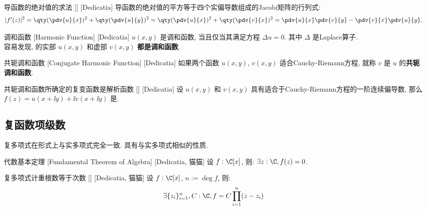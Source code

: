 \documentclass[UTF8]{ctexart}
\begin{document}
        \begin{crl}
            [UUID]
            {导函数的绝对值的求法}
            []
            [Dedicatia]
            导函数的绝对值的平方等于四个实偏导数组成的Jacobi矩阵的行列式: 
            \[|f'(z)|^2=\qty(\pdv{u}{x})^2+\qty(\pdv{u}{y})^2=\qty(\pdv{u}{x})^2+\qty(\pdv{v}{x})^2=\pdv{u}{x}\pdv{v}{y}-\pdv{v}{x}\pdv{u}{y}.\]
        \end{crl}

        \begin{dfn}
            [UUID]
            {调和函数}
            [Harmonic Function]
            [Dedicatia]
            \(u(x,y)\) 是调和函数, 当且仅当其满足方程 \(\Delta u=0\). 其中 \(\Delta\) 是Laplace算子. \\
            容易发现,  的实部 \(u(x,y)\) 和虚部 \(v(x,y)\) \textbf{都是调和函数}. 
        \end{dfn}

        \begin{dfn}
            [UUID]
            {共轭调和函数}
            [Conjugate Harmonic Function]
            [Dedicatia]
            如果两个函数 \(u(x,y)\),  \(v(x,y)\) 适合Cauchy-Riemann方程, 就称 \(v\) 是 \(u\) 的\textbf{共轭调和函数}. 
        \end{dfn}

        \begin{thm}
            [UUID]
            {共轭调和函数所确定的复变函数是解析函数}
            []
            [Dedicatia]
            设 \(u(x,y)\) 和 \(v(x,y)\) 具有适合于Cauchy-Riemann方程的一阶连续偏导数, 那么 \(f(z)=u(x+\ii y)+\ii v(x+\ii y)\) 是. 
        \end{thm}

    \subsection{复函数项级数}

        复多项式在形式上与实多项式完全一致. 具有与实多项式相似的性质. 

        \begin{thm}
            [UUID]
            {代数基本定理}
            [Fundamental Theorem of Algebra]
            [Dedicatia, 猫猫]
            设 \(f:\C[x]\), 则: \(\exists z:\C, f(z)=0\). 
        \end{thm}
        
        \begin{crl}
            []
            {复多项式计重根数等于次数}
            []
            [Dedicatia, 猫猫]
            设 \(f:\C[x]\), \(n:=\deg f\), 则: 
            \[\exists \{z_i\}_{i=1}^n, C:\C, f=C\prod_{i=1}^n(z-z_i)\]
        \end{crl}
\end{document}
